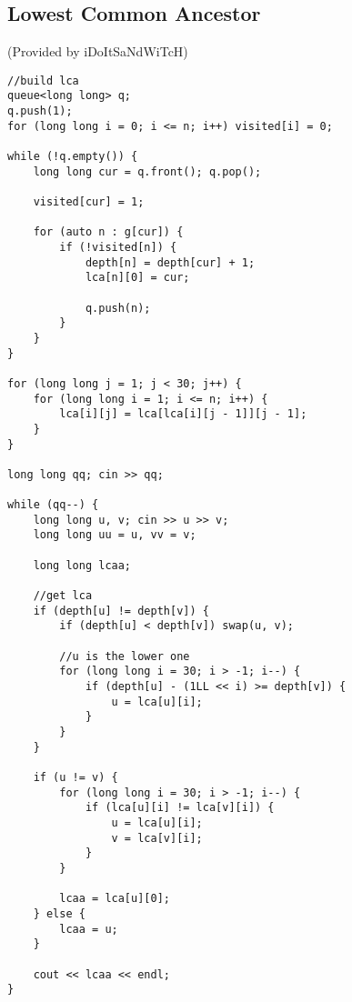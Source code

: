 \documentclass{article}
\begin{document}
\subsection{Lowest Common Ancestor}
(Provided by iDoItSaNdWiTcH)
\begin{verbatim}
//build lca
queue<long long> q;
q.push(1);
for (long long i = 0; i <= n; i++) visited[i] = 0;

while (!q.empty()) {
    long long cur = q.front(); q.pop();

    visited[cur] = 1;

    for (auto n : g[cur]) {
        if (!visited[n]) {
            depth[n] = depth[cur] + 1;
            lca[n][0] = cur;

            q.push(n);
        }
    }
}

for (long long j = 1; j < 30; j++) {
    for (long long i = 1; i <= n; i++) {
        lca[i][j] = lca[lca[i][j - 1]][j - 1];
    }
}
 
long long qq; cin >> qq;

while (qq--) {
    long long u, v; cin >> u >> v;
    long long uu = u, vv = v;

    long long lcaa;

    //get lca
    if (depth[u] != depth[v]) {
        if (depth[u] < depth[v]) swap(u, v);

        //u is the lower one
        for (long long i = 30; i > -1; i--) {
            if (depth[u] - (1LL << i) >= depth[v]) {
                u = lca[u][i];
            }
        }
    }

    if (u != v) {
        for (long long i = 30; i > -1; i--) {
            if (lca[u][i] != lca[v][i]) {
                u = lca[u][i];
                v = lca[v][i];
            }
        }

        lcaa = lca[u][0];
    } else {
        lcaa = u;
    }

    cout << lcaa << endl;
}
\end{verbatim}
\end{document}
